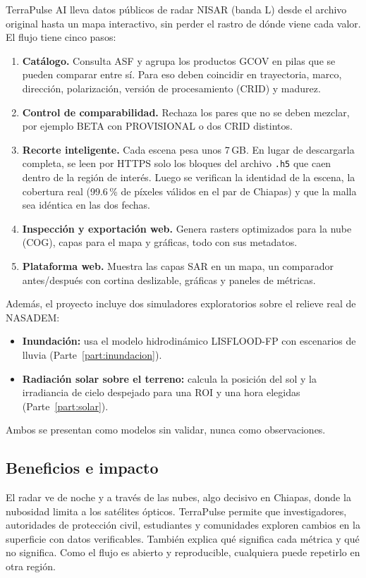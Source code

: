 \documentclass[11pt,a4paper]{article}
\begin{document}
TerraPulse AI lleva datos públicos de radar NISAR (banda L) desde el archivo original hasta un mapa
interactivo, sin perder el rastro de dónde viene cada valor. El flujo tiene cinco pasos:
\begin{enumerate}
  \item \textbf{Catálogo.} Consulta ASF y agrupa los productos GCOV en pilas que se pueden comparar entre
        sí. Para eso deben coincidir en trayectoria, marco, dirección, polarización, versión de
        procesamiento (CRID) y madurez.
  \item \textbf{Control de comparabilidad.} Rechaza los pares que no se deben mezclar, por ejemplo BETA con
        PROVISIONAL o dos CRID distintos.
  \item \textbf{Recorte inteligente.} Cada escena pesa unos 7\,GB. En lugar de descargarla completa, se
        leen por HTTPS solo los bloques del archivo \texttt{.h5} que caen dentro de la región de interés.
        Luego se verifican la identidad de la escena, la cobertura real (99.6\,\% de píxeles válidos en el
        par de Chiapas) y que la malla sea idéntica en las dos fechas.
  \item \textbf{Inspección y exportación web.} Genera rasters optimizados para la nube (COG), capas para el
        mapa y gráficas, todo con sus metadatos.
  \item \textbf{Plataforma web.} Muestra las capas SAR en un mapa, un comparador antes/después con cortina
        deslizable, gráficas y paneles de métricas.
\end{enumerate}
Además, el proyecto incluye dos simuladores exploratorios sobre el relieve real de NASADEM:
\begin{itemize}
  \item \textbf{Inundación:} usa el modelo hidrodinámico LISFLOOD-FP con escenarios de lluvia
        (Parte~\ref{part:inundacion}).
  \item \textbf{Radiación solar sobre el terreno:} calcula la posición del sol y la irradiancia de cielo
        despejado para una ROI y una hora elegidas (Parte~\ref{part:solar}).
\end{itemize}
Ambos se presentan como modelos sin validar, nunca como observaciones.

\subsection{Beneficios e impacto}

El radar ve de noche y a través de las nubes, algo decisivo en Chiapas, donde la nubosidad limita a los
satélites ópticos. TerraPulse permite que investigadores, autoridades de protección civil, estudiantes y
comunidades exploren cambios en la superficie con datos verificables. También explica qué significa cada
métrica y qué no significa. Como el flujo es abierto y reproducible, cualquiera puede repetirlo en otra
región.
\end{document}
